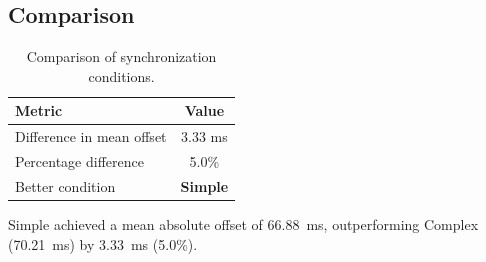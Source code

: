 \subsection*{Comparison}

\begin{table}[h!]
\centering
\begin{tabular}{|l|c|}
\hline
Metric & Value \\
\hline
Difference in mean offset & 3.33 ms \\
Percentage difference & 5.0\% \\
Better condition & \textbf{Simple} \\
\hline
\end{tabular}
\caption{Comparison of synchronization conditions.}
\label{tab:sync_comparison}
\end{table}

Simple achieved a mean absolute offset of 66.88~ms, outperforming Complex (70.21~ms) by 3.33~ms (5.0\%).
